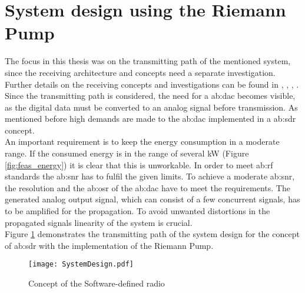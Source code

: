 \section{System design using the Riemann Pump} %
The focus in this thesis was on the transmitting path of the mentioned system, since the receiving architecture and concepts need a separate investigation.
Further details on the receiving concepts and investigations can be found in  \cite{RivetDevalBegueretJ.-B.2007}, \cite{RivetFadhuileDevalEtAl2013}, \cite{RivetDevalD.2008}, \cite{RivetF.2014}.
Since the transmitting path is considered, the need for a \gls{ab:dac} becomes visible, as the digital data must be converted to an analog signal before transmission.
As mentioned before high demands are made to the \gls{ab:dac} implemented in a \gls{ab:sdr} concept.\\
An important requirement is to keep the energy consumption in a moderate range.
If the consumed energy is in the range of several \si{\kilo \watt} (Figure \ref{fig:feas_energy}) it is clear that this is unworkable.
In order to meet \gls{ab:rf} standards the \gls{ab:snr} has to fulfil the given limits. %
To achieve a moderate \gls{ab:snr}, the resolution and the \gls{ab:osr} of the \gls{ab:dac} have to meet the requirements.
The generated analog output signal, which can consist of a few concurrent signals, has to be amplified for the propagation.
To avoid unwanted distortions in the propagated signals linearity of the system is crucial.\\
Figure \ref{fig:System} demonstrates the transmitting path of the system design for the concept of \gls{ab:sdr} with the implementation of the Riemann Pump.

\begin{figure}[ht]
	\centering
  \texttt{[image: SystemDesign.pdf]}
	\caption{Concept of the Software-defined radio}
	\label{fig:System}
\end{figure}

